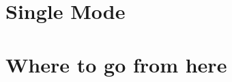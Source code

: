 \documentclass{book}
\begin{document}
\chapter{Single Mode}
\label{c:single_mode}

\chapter{Where to go from here}
\label{c:where_to_go}
\end{document}

